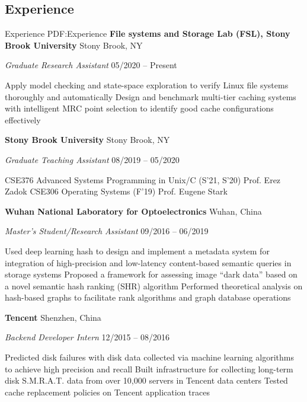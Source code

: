 \documentclass[letterpaper,10pt,oneside]{article}
\begin{document}
\begin{body}
\section
{Experience}
{Experience}
{PDF:Experience}
{\textbf{File systems and Storage Lab (FSL), Stony Brook University}}
\hfill
Stony Brook, NY

\emph{Graduate Research Assistant}
\hfill
05/2020 --
Present

\GapNoBreak
\BulletItem
Apply model checking and state-space exploration to verify Linux file systems thoroughly and automatically
\GapNoBreak
\BulletItem
Design and benchmark multi-tier caching systems with intelligent MRC point selection to identify good cache configurations effectively

\BigGap
{\textbf{Stony Brook University}}
\hfill
Stony Brook, NY

\emph{Graduate Teaching Assistant}
\hfill
08/2019 --
05/2020

\GapNoBreak
\BulletItem
CSE376 Advanced Systems Programming in Unix/C (S'21, S'20) Prof. Erez Zadok
\GapNoBreak
\BulletItem
CSE306 Operating Systems (F'19) Prof. Eugene Stark

\BigGap
{\textbf{Wuhan National Laboratory for Optoelectronics}}
\hfill
Wuhan, China

\emph{Master's Student/Research Assistant}
\hfill
09/2016 --
06/2019

\GapNoBreak
\BulletItem
Used deep learning hash to design and implement a metadata system for integration of high-precision and low-latency content-based semantic queries in storage systems
\GapNoBreak
\BulletItem
Proposed a framework for assessing image ``dark data'' based on a novel semantic hash ranking (SHR) algorithm
\GapNoBreak
\BulletItem
Performed theoretical analysis on hash-based graphs to facilitate rank algorithms and graph database operations

\BigGap
{\textbf{Tencent}} 
\hfill
Shenzhen, China

\emph{Backend Developer Intern}
\hfill
12/2015 --
08/2016

\GapNoBreak
\BulletItem
Predicted disk failures with disk data collected via machine learning algorithms to achieve high precision and recall
\GapNoBreak
\BulletItem
Built infrastructure for collecting long-term disk S.M.R.A.T. data from over 10,000 servers in Tencent data centers
\GapNoBreak
\BulletItem
Tested cache replacement policies on Tencent application traces


\end{body}
\end{document}

